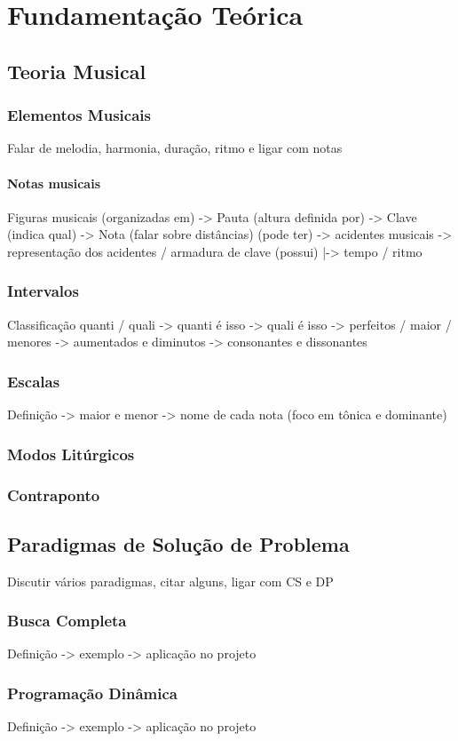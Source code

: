 \chapter[Fundamentação Teórica]{Fundamentação Teórica}

  \section[Teoria Musical]{Teoria Musical}

    \subsection[Elementos Musicais]{Elementos Musicais}

      Falar de melodia, harmonia, duração, ritmo e ligar com notas

      \subsubsection[Notas musicais]{Notas musicais}

        Figuras musicais (organizadas em) -> Pauta (altura definida por) -> Clave (indica qual) -> Nota (falar sobre distâncias) (pode ter) -> acidentes musicais -> representação dos acidentes / armadura de clave
                                              (possui) |-> tempo / ritmo

      \subsection[Intervalos]{Intervalos}

        Classificação quanti / quali -> quanti é isso -> quali é isso -> perfeitos / maior / menores -> aumentados e diminutos -> consonantes e dissonantes
      \subsection[Escalas]{Escalas}
        Definição -> maior e menor -> nome de cada nota (foco em tônica e dominante)
      \subsection[Modos Litúrgicos]{Modos Litúrgicos}
      \subsection[Contraponto]{Contraponto}

    \section[Paradigmas de Solução de Problema]{Paradigmas de Solução de Problema}
      Discutir vários paradigmas, citar alguns, ligar com CS e DP

      \subsection[Busca Completa]{Busca Completa}
        Definição -> exemplo -> aplicação no projeto
      \subsection[Programação Dinâmica]{Programação Dinâmica}
        Definição -> exemplo -> aplicação no projeto

